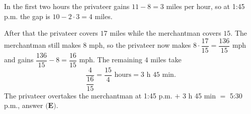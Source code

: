 In the first two hours the privateer gains $11-8=3$ miles per hour, so at 1:45 p.m. the gap is $10-2\cdot3=4$ miles.

After that the privateer covers $17$ miles while the merchantman covers $15$. The merchantman still makes $8$ mph, so the privateer now makes $8\cdot\dfrac{17}{15}=\dfrac{136}{15}$ mph and gains $\dfrac{136}{15}-8=\dfrac{16}{15}$ mph. The remaining $4$ miles take
\[
\dfrac{4}{\dfrac{16}{15}}=\dfrac{15}{4}\text{ hours}=3\text{ h }45\text{ min}.
\]
The privateer overtakes the merchantman at 1:45 p.m. $+$ 3 h 45 min $=$ 5:30 p.m., answer $\boxed{\textbf{(E)}}$.
